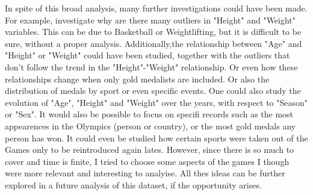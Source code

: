 \documentclass[11pt]{article} %
\begin{document}
In spite of this broad analysis, many further investigations could have been made. For example, investigate why are there many outliers in "Height" and "Weight" variables. This can be due to Basketball or Weightlifting, but it is difficult to be sure, without a proper analysis. Additionally,the relationship between "Age" and "Height" or "Weight" could have been studied, together with the outliers that don't follow the trend in the "Height"-"Weight" relationship. Or even how these relationships change when only gold medalists are included. Or also the distribution of medals by sport or even specific events. One could also study the evolution of "Age", "Height" and "Weight" over the years, with respect to "Season" or "Sex". It would also be possible to focus on specifi records such as the most appearences in the Olympics (person or country), or the most gold medals any person has won. It could even be studied how certain sports were taken out of the Games only to be reintroduced again lates. However, since there is so much to cover and time is finite, I tried to choose some aspects of the games I though were more relevant and interesting to analyise. All thes ideas can be further explored in a future analysis of this dataset, if the opportunity arises.
\end{document}
